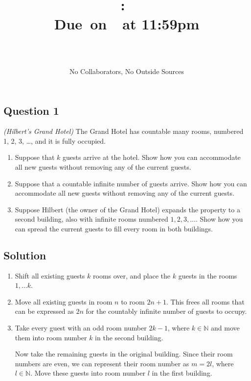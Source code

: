 \documentclass{article}
\title{
    \vspace{2in}
    \textbf{\hmwkClass:\ \hmwkTitle}\\
    \normalsize\vspace{0.1in}\small{Due\ on\ \hmwkDueDate\ at 11:59pm}\\
    \vspace{0.1in}\large{\textit{\hmwkClassInstructor}}
    \vspace{3in}
    \author{\textbf{\hmwkAuthorName} \\ \\ \small No Collaborators, No Outside Sources}
    \date{}
}
\begin{document}
\maketitle
\pagebreak

\subsection*{Question 1}
    \textit{(Hilbert's Grand Hotel)} The Grand Hotel has countable many rooms, numbered 1, 2, 3, \dots, and it is fully occupied.
    \begin{enumerate}
        \item Suppose that $k$ guests arrive at the hotel. Show how you can accommodate all new guests without removing any of the current guests.
        \item Suppose that a countable infinite number of guests arrive. Show how you can accommodate all new guests without removing any of the current guests.
        \item Suppose Hilbert (the owner of the Grand Hotel) expands the property to a second building, also with infinite rooms numbered $1, 2, 3, \dots$. Show how you can spread the current guests to fill every room in both buildings.
    \end{enumerate}

\subsection*{Solution}
    \begin{enumerate}
        \item Shift all existing guests $k$ rooms over, and place the $k$ guests in the rooms $1, \dots k$.
        \item Move all existing guests in room $n$ to room $2n + 1$. This frees all rooms that can be expressed as $2n$ for the countably infinite number of guests to occupy.
        \item Take every guest with an odd room number $2k - 1$, where $k \in \mathbb{N}$ and move them into room number $k$ in the second building.
        
        \vspace{1.5mm}
        Now take the remaining guests in the original building. Since their room numbers are even, we can represent their room number as $m = 2l$, where $l \in \mathbb{N}$. Move these guests into room number $l$ in the first building.
    \end{enumerate}
\end{document}
